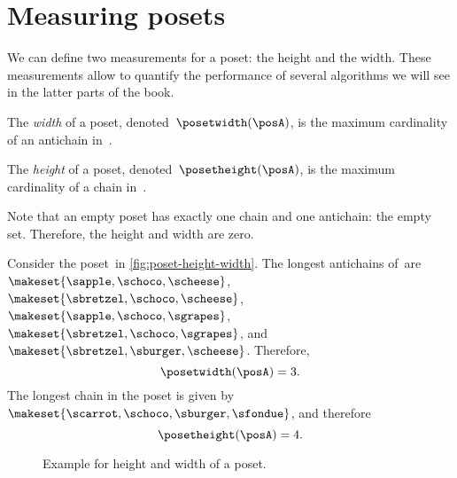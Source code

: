 
\section{Measuring posets}
We can define two measurements for a poset: the height and the width.
These measurements allow to quantify the performance of several algorithms we will see in the latter parts of the book.
\begin{definition}
    \label{def:poset-width}
    The \emph{width} of a poset, denoted~$\posetwidth(\posA)$, is the maximum cardinality of an antichain in~\posA.
\end{definition}

\begin{definition}
    \label{def:poset-height}
    The \emph{height} of a poset, denoted~$\posetheight(\posA)$, is the maximum cardinality of a chain in~\posA.
\end{definition}

Note that an empty poset has exactly one chain and one antichain: the empty set.
Therefore, the height and width are zero.

\begin{example}
    Consider the poset~\posA in \cref{fig:poset-height-width}.
    The longest antichains of~\posA are~$\makeset{\sapple, \schoco, \scheese}$, $\makeset{\sbretzel, \schoco, \scheese}$, $\makeset{\sapple, \schoco, \sgrapes}$, $\makeset{\sbretzel, \schoco, \sgrapes}$, and~$\makeset{\sbretzel, \sburger, \scheese}$.
    Therefore, $$\posetwidth(\posA)=3.
    $$
    The longest chain in the poset is given by~$\makeset{\scarrot,\schoco,\sburger,\sfondue}$, and therefore $$\posetheight(\posA)=4.$$
\end{example}

\begin{figure*}[h]
    \caption{Example for height and width of a poset.
    }
\end{figure*}

